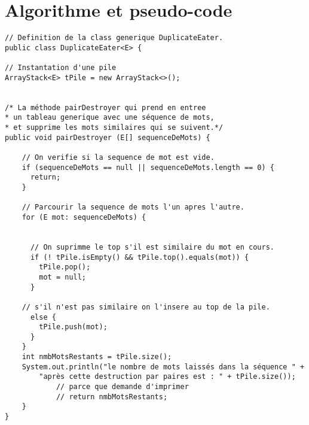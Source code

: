 \documentclass[10pt]{report}
\begin{document}
    \section{Algorithme et pseudo-code}

        \begin{algorithm}[H]
        \DontPrintSemicolon


        \end{algorithm}


    \begin{lstlisting}[style=JavaDraculaWhite]
// Definition de la class generique DuplicateEater.
public class DuplicateEater<E> {

// Instantation d'une pile
ArrayStack<E> tPile = new ArrayStack<>();


/* La méthode pairDestroyer qui prend en entree
* un tableau generique avec une séquence de mots,
* et supprime les mots similaires qui se suivent.*/
public void pairDestroyer (E[] sequenceDeMots) {

    // On verifie si la sequence de mot est vide.
    if (sequenceDeMots == null || sequenceDeMots.length == 0) {
      return;
    }

    // Parcourir la sequence de mots l'un apres l'autre.
    for (E mot: sequenceDeMots) {


      // On suprimme le top s'il est similaire du mot en cours.
      if (! tPile.isEmpty() && tPile.top().equals(mot)) {
        tPile.pop();
        mot = null;
      }

    // s'il n'est pas similaire on l'insere au top de la pile.
      else {
        tPile.push(mot);
      }
    }
    int nmbMotsRestants = tPile.size();
    System.out.println("le nombre de mots laissés dans la séquence " + 
        "après cette destruction par paires est : " + tPile.size());
            // parce que demande d'imprimer
            // return nmbMotsRestants;  
    } 
}     
    \end{lstlisting}
\end{document}
